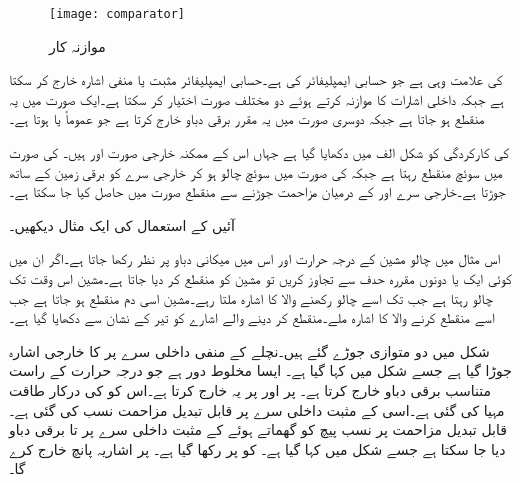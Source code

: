 \begin{figure}
\centering
\texttt{[image: comparator]}
\caption{موازنہ کار}
\label{شکل_حسابی_موازنہ_کار}
\end{figure}

 کی علامت وہی ہے جو حسابی ایمپلیفائر کی ہے۔حسابی ایمپلیفائر مثبت یا منفی اشارہ خارج کر سکتا ہے جبکہ   داخلی اشارات کا موازنہ کرتے ہوئے  دو مختلف صورت اختیار کر سکتا ہے۔ایک صورت میں یہ منقطع ہو جاتا ہے جبکہ دوسری صورت میں یہ مقرر برقی دباو خارج کرتا ہے جو عموماً   یا  ہوتا ہے۔

  کی کارکردگی کو شکل  الف     میں دکھایا گیا ہے جہاں اس کے ممکنہ خارجی صورت  اور  ہیں۔ کی صورت میں سوئچ منقطع رہتا ہے جبکہ  کی صورت میں سوئچ چالو ہو کر خارجی سرے  کو برقی زمین کے ساتھ جوڑتا ہے۔خارجی سرے اور  کے درمیان مزاحمت  جوڑنے سے منقطع صورت میں  حاصل کیا جا سکتا ہے۔

آئیں  کے استعمال کی ایک مثال دیکھیں۔

 اس مثال میں چالو مشین کے درجہ حرارت اور اس میں میکانی دباو پر نظر رکھا جاتا ہے۔اگر ان میں کوئی ایک یا دونوں مقررہ حدف سے تجاوز کریں تو مشین کو منقطع کر دیا جاتا ہے۔مشین اس وقت تک چالو رہتا ہے جب تک اسے چالو رکھنے والا  کا اشارہ ملتا رہے۔مشین اسی دم منقطع ہو جاتا ہے جب اسے منقطع کرنے والا  کا اشارہ ملے۔منقطع کر دینے والے اشارے کو تیر کے نشان سے دکھایا گیا ہے۔

شکل  میں  دو  متوازی جوڑے گئے ہیں۔نچلے  کے منفی داخلی سرے  پر  کا خارجی اشارہ جوڑا گیا ہے جسے شکل میں  کہا گیا ہے۔ ایسا مخلوط دور ہے جو درجہ حرارت کے راست متناسب برقی دباو خارج کرتا ہے۔ پر  اور  پر  یہ  خارج کرتا ہے۔اس کو  کی درکار طاقت مہیا کی گئی ہے۔اسی  کے مثبت داخلی سرے  پر قابل تبدیل مزاحمت نسب کی گئی ہے۔قابل تبدیل مزاحمت پر نسب پیچ کو گھماتے ہوئے  کے مثبت داخلی سرے  پر  تا  برقی دباو دیا  جا سکتا ہے جسے  شکل میں  کہا گیا ہے۔ کو  پر رکھا گیا ہے۔ پر  اشاریہ پانچ  خارج کرے گا۔

